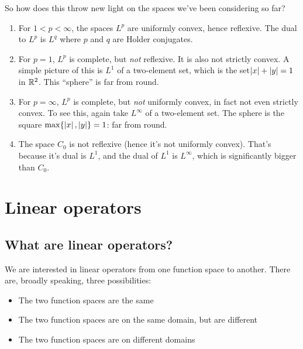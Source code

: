 \documentclass[a4paper]{amsart}
\begin{document}
So how does this throw new light on the spaces we've been considering so far?

\begin{enumerate}

\item For $1 < p < \infty$, the spaces $L^p$ are uniformly convex,
  hence reflexive. The dual to $L^p$ is $L^q$ where $p$ and $q$ are
  Holder conjugates.

\item For $p = 1$, $L^p$ is complete, but {\em not} reflexive. It is
  also not strictly convex. A simple picture of this is $L^1$ of a
  two-element set, which is the set$\left|x\right| + \left|y\right| = 1$ in
  $\mathbb{R}^2$. This ``sphere'' is far from round.

\item For $p = \infty$, $L^p$ is complete, but {\em not} uniformly
  convex, in fact not even strictly convex. To see this, again take
  $L^\infty$ of a two-element set. The sphere is the square $\max \{
  \left|x\right|, \left|y\right| \} = 1$: far from round.

\item The space $C_0$ is not reflexive (hence it's not uniformly
  convex). That's because it's dual is $L^1$, and the dual of $L^1$ is
  $L^\infty$, which is significantly bigger than $C_0$.

\end{enumerate}

\section{Linear operators}

\subsection{What are linear operators?}

We are interested in linear operators from one function space to
another. There are, broadly speaking, three possibilities:

\begin{itemize}

\item The two function spaces are the same

\item The two function spaces are on the same domain, but are different

\item The two function spaces are on different domains

\end{itemize}
\end{document}
